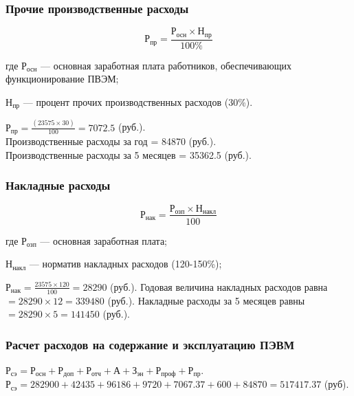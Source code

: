 \subsubsection{Прочие производственные расходы}
\begin{equation}
\textrm{Р}_\textrm{пр}=\frac{\textrm{Р}_\textrm{осн}\times{}\textrm{Н}_\textrm{пр}}{100\%}
\end{equation}
\begin{ESKDexplanation}
	\item[где ]{} $\textrm{Р}_\textrm{осн}$ --- основная заработная плата работников, обеспечивающих функционирование ПВЭМ;
	\item{} $\textrm{Н}_\textrm{пр}$ --- процент прочих производственных расходов (30\%).
\end{ESKDexplanation}
$\textrm{Р}_\textrm{пр} = \frac{(23575 \times{} 30)}{100} = 7072.5$ (руб.). \\
Производственные расходы за год =  84870 (руб.). \\
Производственные расходы за 5 месяцев = 35362.5 (руб.).

\subsubsection{Накладные расходы}
\begin{equation}
	\textrm{Р}_\textrm{нак} = \frac{\textrm{Р}_\textrm{озп} \times{} \textrm{Н}_\textrm{накл}}{100}
\end{equation}
\begin{ESKDexplanation}
	\item[где ]{} $\textrm{Р}_\textrm{озп}$ --- основная заработная плата;
	\item{} $\textrm{Н}_\textrm{накл}$ --- норматив накладных расходов (120-150\%);
\end{ESKDexplanation}
$\textrm{Р}_\textrm{нак} = \frac{23575 \times{} 120}{100} = 28290$ (руб.).
Годовая величина накладных расходов равна $= 28290 \times{} 12 = 339480$ (руб.).
Накладные расходы за 5 месяцев равны $= 28290 \times{} 5 = 141450$ (руб.).

\subsubsection{Расчет расходов на содержание и эксплуатацию ПЭВМ}
$\textrm{Р}_\textrm{сэ} = \textrm{Р}_\textrm{осн} + \textrm{Р}_\textrm{доп} + \textrm{Р}_\textrm{отч} + \textrm{А} + \textrm{З}_\textrm{эн} + \textrm{Р}_\textrm{проф} + \textrm{Р}_\textrm{пр}$. \\
$\textrm{Р}_\textrm{сэ} = 282900 + 42435 + 96186 + 9720 + 7067.37 + 600 + 84870 = 517417.37$ (руб).

